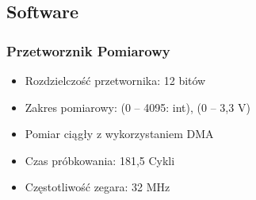 \documentclass[12pt,a4paper]{article}
\begin{document}
\subsection{Software}
\subsubsection{Przetworznik Pomiarowy}
\begin{itemize}
\item Rozdzielczość przetwornika: 12 bitów
\item Zakres pomiarowy: (0 -- 4095: int), (0 -- 3,3 V)
\item Pomiar ciągły z wykorzystaniem DMA
\item Czas próbkowania: 181,5 Cykli
\item Częstotliwość zegara: 32 MHz
\end{itemize}
\end{document}
